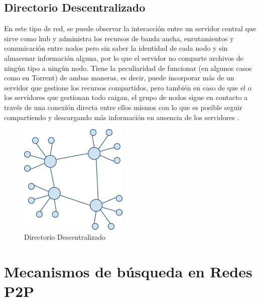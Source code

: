 
\subsection{Directorio Descentralizado }

En este tipo de red, se puede observar la interacción entre un servidor central que sirve como hub y administra los recursos de banda ancha, enrutamientos y comunicación entre nodos pero sin saber la identidad de cada nodo y sin almacenar información alguna, por lo que el servidor no comparte archivos de ningún tipo a ningún nodo. Tiene la peculiaridad de funcionar (en algunos casos como en Torrent) de ambas maneras, es decir, puede incorporar más de un servidor que gestione los recursos compartidos, pero también en caso de que el o los servidores que gestionan todo caigan, el grupo de nodos sigue en contacto a través de una conexión directa entre ellos mismos con lo que es posible seguir compartiendo y descargando más información en ausencia de los servidores \cite{wiki_p2p}.

\begin{figure}[h]
  \centering
    \includegraphics[scale=1]{gfx/p2p_dir_centralizado}
  \caption{Directorio Descentralizado}
  \label{conexionhttp}
\end{figure}


\section{Mecanismos de búsqueda en Redes P2P}

